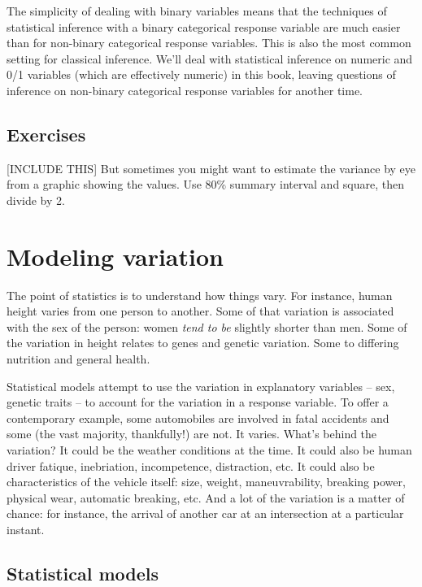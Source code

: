 \documentclass[]{tufte-book}
\begin{document}
The simplicity of dealing with binary variables means that the techniques of statistical inference with a binary categorical response variable are much easier than for non-binary categorical response variables. This is also the most common setting for classical inference. We'll deal with statistical inference on numeric and 0/1 variables (which are effectively numeric) in this book, leaving questions of inference on non-binary categorical response variables for another time.

\hypertarget{exercises}{%
\section{Exercises}\label{exercises}}

{[}INCLUDE THIS{]} But sometimes you might want to estimate the variance by eye from a graphic showing the values. Use 80\% summary interval and square, then divide by 2.

\hypertarget{modeling-variation}{%
\chapter{Modeling variation}\label{modeling-variation}}

The point of statistics is to understand how things vary. For instance, human height varies from one person to another. Some of that variation is associated with the sex of the person: women \emph{tend to be} slightly shorter than men. Some of the variation in height relates to genes and genetic variation. Some to differing nutrition and general health.

Statistical models attempt to use the variation in explanatory variables -- sex, genetic traits -- to account for the variation in a response variable. To offer a contemporary example, some automobiles are involved in fatal accidents and some (the vast majority, thankfully!) are not. It varies. What's behind the variation? It could be the weather conditions at the time. It could also be human driver fatique, inebriation, incompetence, distraction, etc. It could also be characteristics of the vehicle itself: size, weight, maneuvrability, breaking power, physical wear, automatic breaking, etc. And a lot of the variation is a matter of chance: for instance, the arrival of another car at an intersection at a particular instant.

\hypertarget{statistical-models}{%
\section{Statistical models}\label{statistical-models}}
\end{document}
